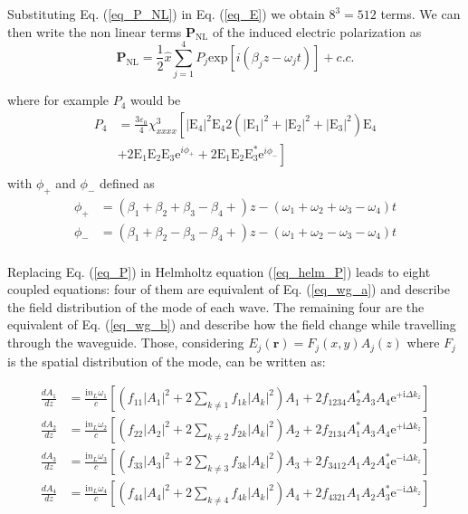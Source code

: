 \documentclass[12pt,a4paper,twoside]{article}
\begin{document}
Substituting Eq. (\ref{eq_P_NL}) in Eq. (\ref{eq_E}) we obtain $8^3=512$ terms.
We can then write the non linear terms $\mathrm{\textbf{P}_{NL}}$ of the induced electric polarization as
\begin{equation}
	\mathrm{\textbf{P}_{NL}} = \frac{1}{2}\hat{x} \sum_{j=1}^4 P_j \mathrm{exp}[i(\beta_j z - \omega_j t)] + c.c.
	\label{eq_P}
\end{equation}

where for example $P_4$ would be
\[
\begin{array}{rl}
	P_4 &= \frac{3\varepsilon_0}{4} \chi^3_{xxxx}\left[ |\mathrm{E}_4|^2\mathrm{E}_4 2(|\mathrm{E}_1|^2+|\mathrm{E}_2|^2+|\mathrm{E}_3|^2)\mathrm{E}_4 \right. \\
	&+ \left. 2\mathrm{E}_1\mathrm{E}_2\mathrm{E}_3\mathrm{e}^{i\phi_+}+2\mathrm{E}_1\mathrm{E}_2\mathrm{E}_3^*\mathrm{e}^{i\phi_-}\right] \\

\end{array}
\]
\hspace{18pt}with $\phi_+$ and $\phi_-$ defined as
\[
\begin{array}{lr}
\phi_+ &= (\beta_1+\beta_2+\beta_3-\beta_4+)z - (\omega_1+\omega_2+\omega_3-\omega_4)t \\
\phi_- &= (\beta_1+\beta_2-\beta_3-\beta_4+)z - (\omega_1+\omega_2-\omega_3-\omega_4)t \\
\end{array}
\]

Replacing Eq. (\ref{eq_P}) in Helmholtz equation (\ref{eq_helm_P}) leads to eight coupled equations: four of them are equivalent of Eq. (\ref{eq_wg_a}) and describe the field distribution of the mode of each wave.
The remaining four are the equivalent of Eq. (\ref{eq_wg_b}) and describe how the field change while travelling through the waveguide.
Those, considering $E_j(\textbf{r}) = F_j(x,y)A_j(z)$ where $F_j$ is the spatial distribution of the mode, can be written as:

\begin{subequations}
\begin{align}
	\frac{dA_1}{dz} &= \frac{\mathrm{i}n_L\omega_1}{c}\left[ \left( f_{11} |A_1|^2 + 2 \sum_{k\neq1} f_{1k}|A_k|^2\right)A_1 + 2f_{1234}A_2^*A_3A_4\mathrm{e}^{+\mathrm{i}\Delta k_z} \right]
		\label{eq_coupled_amplitude_a}\\
	\frac{dA_2}{dz} &= \frac{\mathrm{i}n_L\omega_2}{c}\left[ \left( f_{22} |A_2|^2 + 2 \sum_{k\neq2} f_{2k}|A_k|^2\right)A_2 + 2f_{2134}A_1^*A_3A_4\mathrm{e}^{+\mathrm{i}\Delta k_z} \right]
		\label{eq_coupled_amplitude_b}\\
	\frac{dA_3}{dz} &= \frac{\mathrm{i}n_L\omega_3}{c}\left[ \left( f_{33} |A_3|^2 + 2 \sum_{k\neq3} f_{3k}|A_k|^2\right)A_3 + 2f_{3412}A_1A_2A_4^*\mathrm{e}^{-\mathrm{i}\Delta k_z} \right]
		\label{eq_coupled_amplitude_c}\\
	\frac{dA_4}{dz} &= \frac{\mathrm{i}n_L\omega_4}{c}\left[ \left( f_{44} |A_4|^2 + 2 \sum_{k\neq4} f_{4k}|A_k|^2\right)A_4 + 2f_{4321}A_1A_2A_3^*\mathrm{e}^{-\mathrm{i}\Delta k_z} \right]
		\label{eq_coupled_amplitude_d}
\end{align}
\end{subequations}
\end{document}
